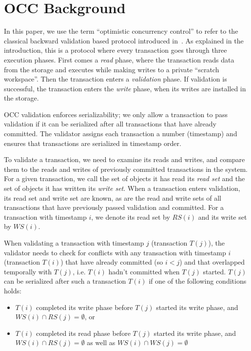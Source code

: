 \section{OCC Background}\label{sec:background}

In this paper, we use the term ``optimistic concurrency control'' to refer to the classical backward validation based protocol introduced in~\cite{kung81tods}. As explained in the introduction, this is a protocol where every transaction goes through three execution phases. First comes a \emph{read} phase, where the transaction reads data from the storage and executes while making writes to a private ``scratch workspace''. Then the transaction enters a \emph{validation} phase. If validation is successful, the transaction enters the \emph{write} phase, when its writes are installed in the storage. 

OCC validation enforces serializability; we only allow a transaction to pass validation if it can be serialized after all transactions that have already committed. The validator assigns each transaction a number (timestamp) and ensures that transactions are serialized in timestamp order.

To validate a transaction, we need to examine its reads and writes, and compare them to the reads and writes of previously committed transactions in the system. For a given transaction, we call the set of objects it has read its \emph{read set} and the set of objects it has written its \emph{write set}. When a transaction enters validation, its read set and write set are known, as are the read and write sets of all transactions that have previously passed validation and committed. For a transaction with timestamp $i$, we denote its read set by $RS(i)$ and its write set by $WS(i)$.

When validating a transaction with timestamp $j$ (transaction $T(j)$), the validator needs to check for conflicts with any transaction with timestamp $i$ (transaction $T(i)$) that have already committed (so $i < j$) and that overlapped temporally with $T(j)$, i.e. $T(i)$ hadn't committed when $T(j)$ started. 
$T(j)$ can be serialized after such a transaction $T(i)$ if one of the following conditions holds:
\begin{itemize}
\item $T(i)$ completed its write phase before $T(j)$ started its write phase, and $WS(i) \cap RS(j) = \emptyset$, or
\item $T(i)$ completed its read phase before $T(j)$ started its write phase, and $WS(i) \cap RS(j) = \emptyset$ as well as $WS(i) \cap WS(j) = \emptyset$
\end{itemize}

